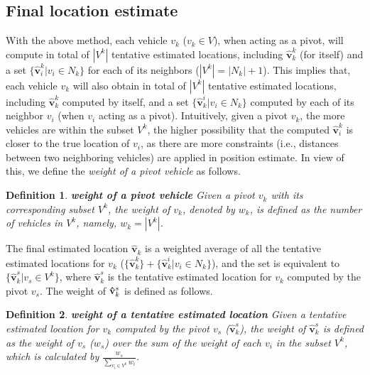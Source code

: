 \documentclass[letterpaper, 10 pt, conference]{ieeeconf}
\newtheorem{definition}{\hspace{1em}Definition}
\begin{document}
\subsection{Final location estimate}

With the above method, each vehicle $v_k$ ($v_k \in V$), when acting as a pivot, will compute in total of $|V^k|$ tentative estimated locations, including ${\mathbf{\hat v}}_k^k $ (for itself) and a set $\{ {\mathbf{\hat v}}_i^k |v_i  \in N_k \} $ for each of its neighbors ($|V^k | = |N_k | + 1$).  This implies that, each vehicle $v_k$ will also obtain in total of  $|V^k|$   tentative estimated locations, including ${\mathbf{\hat v}}_k^k $  computed by itself, and a set $\{ {\mathbf{\hat v}}_k^i |v_i  \in N_k \} $ computed by each of its neighbor $v_i$  (when $v_i$ acting as a pivot). Intuitively, given a pivot $v_k$, the more vehicles are within the subset $V^k$, the higher possibility that the computed ${\mathbf{\hat v}}_i^k $
 is closer to the true location of $v_i$, as there are more constraints (i.e., distances between two neighboring vehicles) are applied in position estimate. In view of this, we define the \emph{weight of a pivot vehicle} as follows.

\vspace{0.5em}
\begin{definition}\label{def2}
\textbf{weight of a pivot vehicle} Given a pivot $v_k$  with its corresponding subset $V^k$, the weight of $v_k$, denoted by $w_k$, is defined as the number of vehicles in $V^k$, namely, $w_k  = \left| {V^k } \right|$.
\end{definition}

The final estimated location ${\mathbf{\hat v}}_k $ is a weighted average of all the tentative estimated locations for $v_k$ ($\{ {\mathbf{\hat v}}_k^k \}  + \{ {\mathbf{\hat v}}_k^i |v_i  \in N_k \} $), and the set is equivalent to  $\{ {\mathbf{\hat v}}_k^s |v_s  \in V^k \} $, where ${\mathbf{\hat v}}_k^s $ is the tentative estimated location for $v_k$ computed by the pivot $v_s$. The weight of ${\bf{\hat v}}_k^s $ is defined as follows.

\vspace{0.5em}
\begin{definition}\label{def3}
\textbf{weight of a tentative estimated location} Given a tentative estimated location for $v_k$ computed by the pivot $v_s$ (${\mathbf{\hat v}}_k^s $), the weight of ${\mathbf{\hat v}}_k^s $  is defined as the weight of $v_s$ ($w_s$) over the sum of the weight of each $v_i$ in the subset $V^k$, which is calculated by $\frac{{w_s }}{{\sum\limits_{v_i  \in V^k } {w_i } }}$.
\end{definition}
\end{document}
